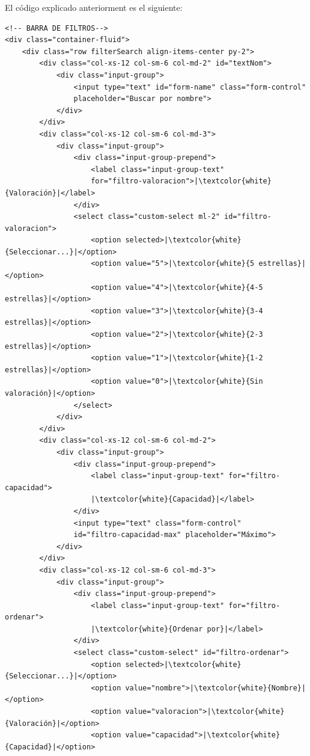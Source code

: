 \documentclass{article}
\begin{document}
El código explicado anteriorment es el siguiente:
\begin{verbatim}
<!-- BARRA DE FILTROS-->
<div class="container-fluid">
    <div class="row filterSearch align-items-center py-2">
        <div class="col-xs-12 col-sm-6 col-md-2" id="textNom">
            <div class="input-group">
                <input type="text" id="form-name" class="form-control" 
                placeholder="Buscar por nombre">
            </div>
        </div>
        <div class="col-xs-12 col-sm-6 col-md-3">
            <div class="input-group">
                <div class="input-group-prepend">
                    <label class="input-group-text" 
                    for="filtro-valoracion">|\textcolor{white}{Valoración}|</label>
                </div>
                <select class="custom-select ml-2" id="filtro-valoracion">
                    <option selected>|\textcolor{white}{Seleccionar...}|</option>
                    <option value="5">|\textcolor{white}{5 estrellas}|</option>
                    <option value="4">|\textcolor{white}{4-5 estrellas}|</option>
                    <option value="3">|\textcolor{white}{3-4 estrellas}|</option>
                    <option value="2">|\textcolor{white}{2-3 estrellas}|</option>
                    <option value="1">|\textcolor{white}{1-2 estrellas}|</option>
                    <option value="0">|\textcolor{white}{Sin valoración}|</option>
                </select>
            </div>
        </div>
        <div class="col-xs-12 col-sm-6 col-md-2">
            <div class="input-group">
                <div class="input-group-prepend">
                    <label class="input-group-text" for="filtro-capacidad">
                    |\textcolor{white}{Capacidad}|</label>
                </div>
                <input type="text" class="form-control" 
                id="filtro-capacidad-max" placeholder="Máximo">
            </div>
        </div>
        <div class="col-xs-12 col-sm-6 col-md-3">
            <div class="input-group">
                <div class="input-group-prepend">
                    <label class="input-group-text" for="filtro-ordenar">
                    |\textcolor{white}{Ordenar por}|</label>
                </div>
                <select class="custom-select" id="filtro-ordenar">
                    <option selected>|\textcolor{white}{Seleccionar...}|</option>
                    <option value="nombre">|\textcolor{white}{Nombre}|</option>
                    <option value="valoracion">|\textcolor{white}{Valoración}|</option>
                    <option value="capacidad">|\textcolor{white}{Capacidad}|</option>

\end{verbatim}
\end{document}
